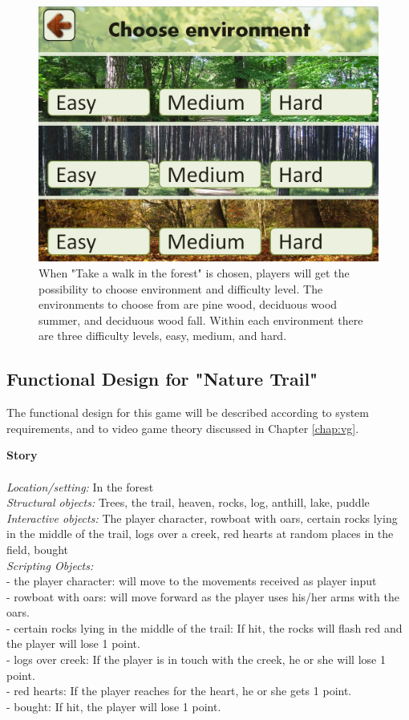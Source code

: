 \begin{figure} [H]
\centering
\includegraphics[scale=0.45]{chooseEnvironment.jpg}
\caption[Choice of environment and difficulty level]{When "Take a walk in the forest" is chosen, players will get the possibility to choose environment and difficulty level. The environments to choose from are pine wood, deciduous wood summer, and deciduous wood fall. Within each environment there are three difficulty levels, easy, medium, and hard.}
\label{fig:omgivelseNivaa}
\end{figure}
     
\subsection{Functional Design for "Nature Trail"}
The functional design for this game will be described according to system requirements, and to video game theory discussed in Chapter \ref{chap:vg}.

\textbf{Story} \\ \\
\emph{Location/setting:} In the forest \\
\emph{Structural objects:} Trees, the trail, heaven, rocks, log, anthill, lake, puddle \\
\emph{Interactive objects:} The player character, rowboat with oars, certain rocks lying in the middle of the trail, logs over a creek, red hearts at random places in the field, bought \\
\emph{Scripting Objects:} \\
- the player character: will move to the movements received as player input\\
- rowboat with oars: will move forward as the player uses his/her arms with the oars. \\
- certain rocks lying in the middle of the trail: If hit, the rocks will flash red and the player will lose 1 point. \\
- logs over creek: If the player is in touch with the creek, he or she will lose 1 point. \\
- red hearts: If the player reaches for the heart, he or she gets 1 point. \\
- bought: If hit, the player will lose 1 point.

